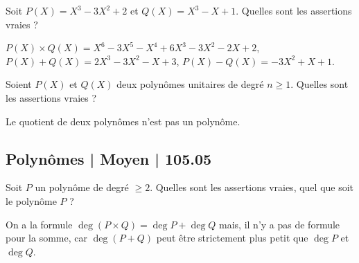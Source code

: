 \begin{question}

Soit $P(X) = X^3-3X^2+2$ et $Q(X) = X^3-X+1$.
Quelles sont les assertions vraies ?
\begin{answers}


    
\end{answers}
\begin{explanations}
$P(X)\times Q(X) = X^6 - 3 X^5 - X^4 + 6 X^3 - 3 X^2 - 2 X + 2$, 
$P(X) + Q(X) = 2 X^3 - 3 X^2 - X + 3$,
$P(X) - Q(X) = -3 X^2 + X + 1$.
\end{explanations}
\end{question}


\begin{question}

Soient $P(X)$ et $Q(X)$ deux polynômes unitaires de degré $n\ge1$.
Quelles sont les assertions vraies ?
\begin{answers}

    

\end{answers}
\begin{explanations}
Le quotient de deux polynômes n'est pas un polynôme.
\end{explanations}
\end{question}


\subsection{Polynômes | Moyen | 105.05}


\begin{question}

Soit $P$ un polynôme de degré $\ge 2$.
Quelles sont les assertions vraies, quel que soit le polynôme $P$ ?
\begin{answers}



\end{answers}
\begin{explanations}
On a la formule $\deg(P\times Q) = \deg P + \deg Q$ mais, il n'y a pas de formule pour la somme, car $\deg(P + Q)$ peut être strictement plus petit que $\deg P$ et $\deg Q$.
\end{explanations}
\end{question}


